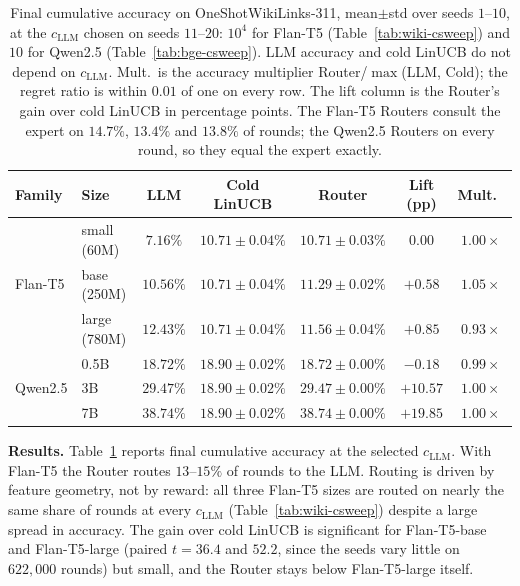 \documentclass[anon]{alt2027} %
\begin{document}
\begin{table}[h]
\centering
\caption{Final cumulative accuracy on OneShotWikiLinks-311, mean$\pm$std over
seeds $1$--$10$, at the $c_{\mathrm{LLM}}$ chosen on seeds $11$--$20$: $10^4$ for Flan-T5
(Table~\ref{tab:wiki-csweep}) and $10$ for Qwen2.5 (Table~\ref{tab:bge-csweep}).
LLM accuracy and cold LinUCB do not depend on $c_{\mathrm{LLM}}$. Mult.\ is the accuracy
multiplier Router/$\max$(LLM, Cold); the regret ratio is within $0.01$ of one
on every row. The lift column is the Router's gain over cold LinUCB in
percentage points. The Flan-T5 Routers consult the expert on $14.7\%$,
$13.4\%$ and $13.8\%$ of rounds; the Qwen2.5 Routers on every round, so they
equal the expert exactly.}
\label{tab:wiki-results}
\small
\begin{tabular}{@{}llccccc@{}}
\toprule
Family & Size & LLM & Cold LinUCB & Router & Lift (pp) & Mult.\ \\
\midrule
\multirow{3}{*}{Flan-T5} & small (60M) & $7.16\%$  & $10.71\pm 0.04\%$ & $10.71\pm 0.03\%$ & $0.00$ & $1.00\times$ \\
& base (250M)   & $10.56\%$ & $10.71\pm 0.04\%$ & $11.29\pm 0.02\%$ & $+0.58$ & $1.05\times$ \\
& large (780M)  & $12.43\%$ & $10.71\pm 0.04\%$ & $11.56\pm 0.04\%$ & $+0.85$ & $0.93\times$ \\
\midrule
\multirow{3}{*}{Qwen2.5} & 0.5B  & $18.72\%$ & $18.90\pm 0.02\%$ & $18.72\pm0.00\%$ & $-0.18$ & $0.99\times$ \\
& 3B  & $29.47\%$ & $18.90\pm 0.02\%$ & $29.47\pm0.00\%$ & $+10.57$ & $1.00\times$ \\
& 7B  & $38.74\%$ & $18.90\pm 0.02\%$ & $38.74\pm0.00\%$ & $+19.85$ & $1.00\times$ \\
\bottomrule
\end{tabular}
\end{table}

\textbf{Results.} Table~\ref{tab:wiki-results} reports final cumulative
accuracy at the selected $c_{\mathrm{LLM}}$. With Flan-T5 the Router routes $13$--$15\%$
of rounds to the LLM. Routing is driven by feature geometry, not by
reward: all three Flan-T5 sizes are routed on nearly the same share of
rounds at every $c_{\mathrm{LLM}}$ (Table~\ref{tab:wiki-csweep}) despite a large spread
in accuracy. The gain over cold LinUCB is significant for Flan-T5-base and
Flan-T5-large (paired $t=36.4$ and $52.2$, since the seeds vary little on
$622{,}000$ rounds) but small, and the Router stays below Flan-T5-large itself.
\end{document}
